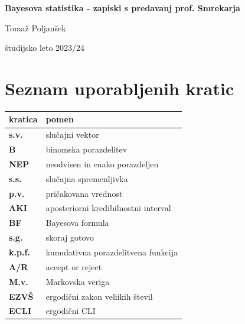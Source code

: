 \documentclass[a4paper, 12pt]{book}
\title{\ttitle}
\author{\tauthor}
\date{\tdate}
\newcommand{\ttitle}{Bayesova statistika - zapiski s predavanj prof. Smrekarja}
\newcommand{\tauthor}{Tomaž Poljanšek}
\newcommand{\tdate}{študijsko leto 2023/24}
\theoremstyle{definition}
\theoremstyle{remark}
\newcommand\mymaketitle{
  \begin{titlepage}
    \begin{center}
        \vspace*{4cm}
        \Huge
        \textbf{\ttitle}
                        
        \vspace{1.5cm}
        \huge
        \tauthor
            
        \vspace{3cm}
        \Large
        \tdate
    \end{center}
  \end{titlepage}
}
\begin{document}
\renewcommand{\thepage}{}
\newcommand{\sn}[1]{"`#1"'}

\mymaketitle

\clearpage
\frontmatter

\pagestyle{empty}
\def\thepage{}
\tableofcontents{}

\def\x{\hspace{3ex}}    %
\def\y{\hspace{2.45ex}}  %
\def\z{\hspace{1.9ex}}    %
\stackMath

\clearpage
{}

\section*{Seznam uporabljenih kratic}

\noindent\begin{tabular}{p{}|p{}}
  {\bf kratica} & {pomen} \\
  \hline
  {\bf s.v.} & {slučajni vektor} \\
  {\bf B} & {binomska porazdelitev} \\
  {\bf NEP} & {neodvisen in enako porazdeljen} \\
  {\bf s.s.} & {slučajna spremenljivka} \\
  {\bf p.v.} & {pričakovana vrednost} \\
  {\bf AKI} & {aposteriorni kredibilnostni interval} \\
  {\bf BF} & {Bayesova formula} \\
  {\bf s.g.} & {skoraj gotovo} \\
  {\bf k.p.f.} & {kumulativna porazdelitvena funkcija} \\
  {\bf A/R} & {accept or reject} \\
  {\bf M.v.} & {Markovska veriga} \\
  {\bf EZVŠ} & {ergodični zakon veliikih števil} \\
  {\bf ECLI} & {ergodični CLI}
\end{tabular}



\mainmatter
\setcounter{page}{1}
\pagestyle{fancy}
\end{document}
